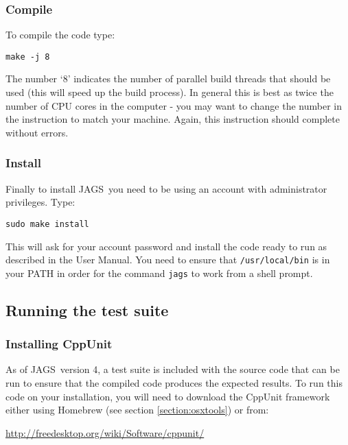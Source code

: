 \documentclass[11pt, a4paper, titlepage]{article}
\newcommand{\JAGS}{\textsf{JAGS}}
\begin{document}
\subsubsection{Compile}
\label{section:osxcompile}

To compile the code type: 

\begin{verbatim} 
make -j 8 
\end{verbatim} 

The number `8' indicates the number of parallel build threads that
should be used (this will speed up the build process).  In general this
is best as twice the number of CPU cores in the computer - you may want
to change the number in the instruction to match your machine. Again,
this instruction should complete without errors.

\subsubsection{Install}
\label{section:osxinstall}

Finally to install \JAGS\ you need to be using an account with
administrator privileges.  Type: 

\begin{verbatim}
sudo make install
\end{verbatim} 

This will ask for your account password and install the code ready to 
run as described in the User Manual. You need to ensure that
\texttt{/usr/local/bin} is in your PATH in order for the command 
\texttt{jags} to work from a shell prompt.

\subsection{Running the test suite}
\label{section:osxtest}

\subsubsection{Installing CppUnit}

As of \JAGS\ version 4, a test suite is included with the source code that can be
run to ensure that the compiled code produces the expected results.  To run
this code on your installation, you will need to download the CppUnit framework either
using Homebrew (see section \ref{section:osxtools}) or from:

\url{http://freedesktop.org/wiki/Software/cppunit/} 
\end{document}
